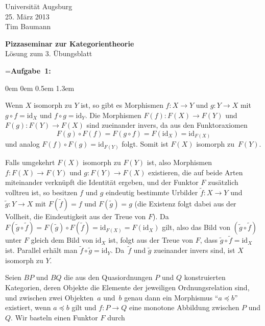 \documentclass[a4paper,ngerman]{scrartcl}
\theoremstyle{definition}
\theoremstyle{plain}
\theoremstyle{remark}
\newcommand{\id}{\mathrm{id}}
\begin{document}
\vspace*{-4em}
\begin{flushright}Universität Augsburg \\ 25. März 2013 \\ Tim Baumann\end{flushright}

\begin{center}\Large \textbf{Pizzaseminar zur Kategorientheorie} \\
Lösung zum 3. Übungsblatt
\end{center}
\vspace{2em}

\newbox{\mybox}
\setbox\mybox=\hbox{\textbf{Aufgabe 1:}}

\begin{list}{}{0em \leftmargin0em \itemindent0.5em \itemsep 1.3em}
\item[\textbf{Aufgabe 1:}]\mbox{}

Wenn $X$ isomorph zu $Y$ ist, so gibt es Morphismen $f : X \to Y$ und $g : Y \to X$ mit $g \circ f = \id_X$ und $f \circ g = \id_Y$.
Die Morphismen $F(f):F(X) \to F(Y)$ und $F(g):F(Y) \to F(X)$ sind zueinander invers, da aus den Funktoraxiomen
\[F(g) \circ F(f) = F(g \circ f) = F(\id_X) = \id_{F(X)}\]
und analog $F(f) \circ F(g) = \id_{F(Y)}$ folgt. Somit ist $F(X)$ isomorph zu~$F(Y)$.

Falls umgekehrt $F(X)$ isomorph zu $F(Y)$ ist, also Morphismen $f : F(X) \to F(Y)$ und $g : F(Y) \to F(X)$ existieren, die auf beide Arten miteinander verknüpft die Identität ergeben, und der Funktor $F$ zusätzlich volltreu ist, so besitzen $f$ und $g$ eindeutig bestimmte Urbilder $\widetilde{f} : X \to Y$ und $\widetilde{g} : Y \to X$ mit $F(\widetilde{f}) = f$ und $F(\widetilde{g}) = g$ (die Existenz folgt dabei aus der Vollheit, die Eindeutigkeit aus der Treue von $F$). Da
$F(\widetilde{g} \circ \widetilde{f}) = F(\widetilde{g}) \circ F(\widetilde{f}) = \id_{F(X)} = F(\id_X)$ gilt, also das Bild von $(\widetilde{g} \circ \widetilde{f})$ unter $F$ gleich dem Bild von $\id_X$ ist, folgt aus der Treue von $F$, dass $\widetilde{g} \circ \widetilde{f} = \id_X$ ist. Parallel erhält man $\widetilde{f} \circ \widetilde{g} = \id_Y$. Da~$\widetilde{f}$ und $\widetilde{g}$ zueinander invers sind, ist $X$ isomorph zu $Y$.

\item[\textbf{Aufgabe 2:}]\mbox{}

Seien $BP$ und $BQ$ die aus den Quasiordnungen $P$ und $Q$ konstruierten Kategorien, deren Objekte die Elemente der jeweiligen Ordnungsrelation sind, und zwischen zwei Objekten~$a$ und~$b$ genau dann ein Morphismus "`$a \preceq b$"' existiert, wenn $a \preceq b$ gilt und $f:P \to Q$ eine monotone Abbildung zwischen $P$ und $Q$.
Wir basteln einen Funktor $F$ durch


\end{list}
\end{document}
